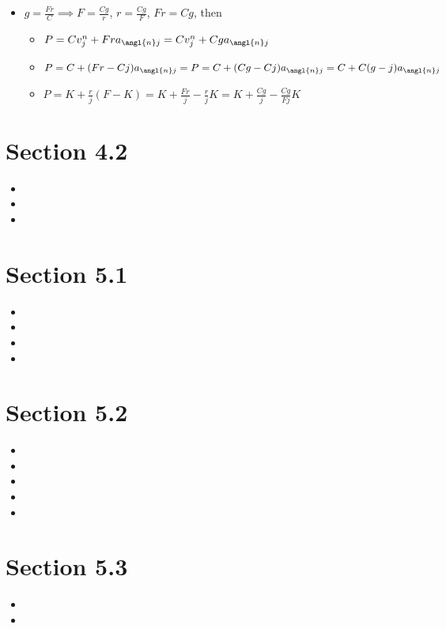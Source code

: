 \documentclass{article}
\begin{document}
\begin{itemize}
	\item [18.] $g=\frac{Fr}{C} \implies F=\frac{Cg}{r}$, $r=\frac{Cg}{F}$, $Fr=Cg$, then \begin{itemize}
		\item [(4.2E)] $P=Cv_j^n+Fra_{\angl{n}j}=Cv_j^n+Cga_{\angl{n}j}$
		\item [(4.3E)] $P=C+(Fr-Cj)a_{\angl{n}j}=P=C+(Cg-Cj)a_{\angl{n}j}=C+C(g-j)a_{\angl{n}j}$
		\item [(4.4E)] $P=K+\frac{r}{j}(F-K)=K+\frac{Fr}{j}-\frac{r}{j}K=K+\frac{Cg}{j}-\frac{Cg}{Fj}K$
	\end{itemize}
\end{itemize}

\section*{Section 4.2}
\begin{itemize}
	\item [1.]
	\item [4.]
	\item [5.]
\end{itemize}

\section*{Section 5.1}
\begin{itemize}
	\item [4.]
	\item [7.]
	\item [9.]
	\item [11.]
\end{itemize}

\section*{Section 5.2}
\begin{itemize}
	\item [1.]
	\item [2.]
	\item [3.]
	\item [4.]
	\item [6.]
\end{itemize}

\section*{Section 5.3}
\begin{itemize}
	\item [2.]
	\item [3.]
\end{itemize}
\end{document}

